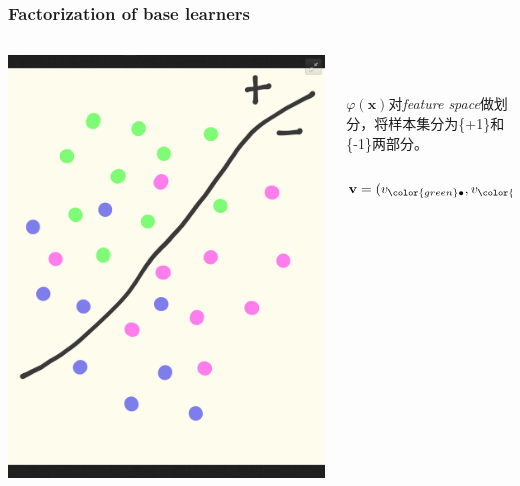 \documentclass{beamer}
\begin{document}
\begin{frame}
\frametitle{Factorization of base learners}
\begin{columns}[T]
  \begin{column}{.55\textwidth}
    \includegraphics[width=\textwidth]{img/gbc_2.png}
  \end{column}
  \begin{column}{.45\textwidth}
    \ \\ \ \\
    $\varphi(\mathbf{x})$对\textit{feature space}做划分，将样本集分为\{+1\}和\{-1\}两部分。\\ \ \\
    $$\mathbf{v} = (v_{{\color{green} \bullet}}, v_{{\color{blue} \bullet}}, v_{{\color{magenta} \bullet}}) = (1,1,1)$$
  \end{column}
\end{columns}
\end{frame}
\end{document}
